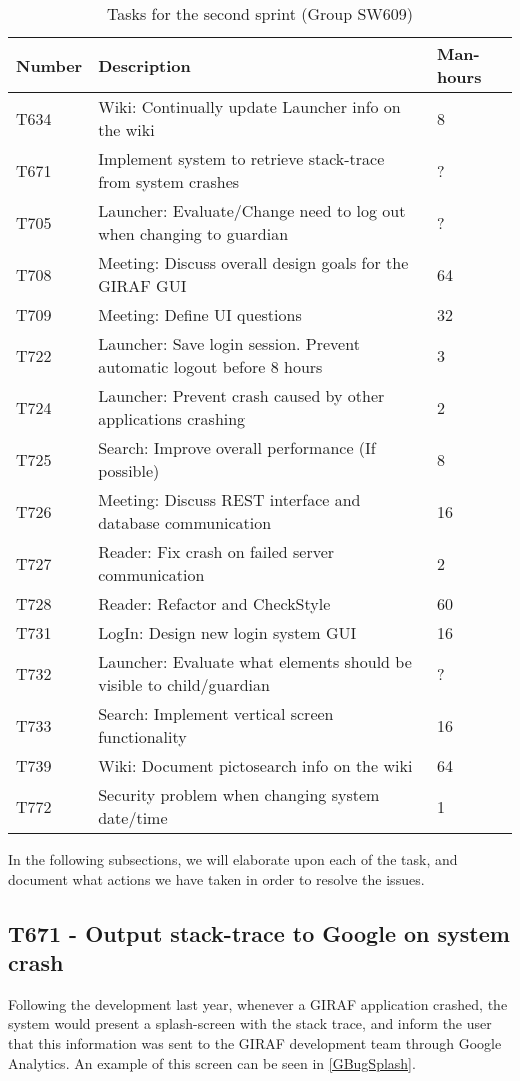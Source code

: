 \begin{table}[H]
\centering
\begin{tabular}{|l|l|l|}
\hline
Number	& Description & Man-hours												\\\hline
T634  	& Wiki: Continually update Launcher info on the wiki & 8\\\hline 
T671    & Implement system to retrieve stack-trace from system crashes & ?
\\\hline 
T705	& Launcher: Evaluate/Change need to log out when changing  to guardian
& ? \\\hline 
T708    & Meeting: Discuss overall design goals for the GIRAF GUI & 64\\\hline
T709	& Meeting: Define UI questions & 32 \\\hline 
T722   	& Launcher: Save login session. Prevent automatic logout before 8 hours
&3 \\\hline 
T724   	& Launcher: Prevent crash caused by other applications
crashing & 2 \\\hline 
T725  	& Search: Improve overall performance (If possible)	& 8 \\\hline 
T726    & Meeting: Discuss REST interface and database communication & 16
\\\hline 
T727    & Reader: Fix crash on failed server communication  & 2				\\\hline 
T728	& Reader: Refactor and CheckStyle  & 60\\\hline
T731    & LogIn: Design new login system GUI & 16     			\\\hline
T732    & Launcher: Evaluate what elements should be visible to
child/guardian & ?\\\hline 
T733    & Search: Implement vertical screen functionality & 16   			\\\hline 
T739    & Wiki: Document pictosearch info on the wiki & 64	\\\hline
T772    & Security problem when changing system date/time & 1 \\\hline
\end{tabular}
\caption{Tasks for the second sprint (Group SW609)} 
\label{SprintTwoTasks}    
\end{table} 

In the following subsections, we will elaborate upon each of the task, and
document what actions we have taken in order to resolve the issues.

\newpage
\subsection{T671 - Output stack-trace to Google on system crash}
Following the development last year, whenever a GIRAF application crashed, the
system would present a splash-screen with the stack trace, and inform the user
that this information was sent to the GIRAF development team through Google
Analytics. An example of this screen can be seen in \autoref{GBugSplash}.

